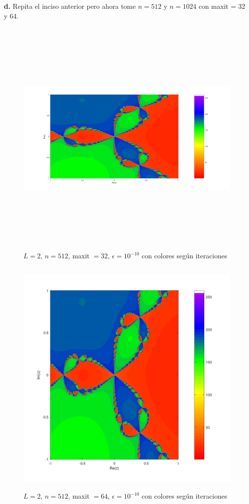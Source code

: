 \documentclass{article} %
\begin{document}
\textbf{d.} Repita el inciso anterior pero ahora tome $n=512$ y $n=1024$ con maxit = 32 y 64.

\begin{figure}[H]
    \centering
    \includegraphics[width=152mm, height=120mm]{images/L2n512maxit32e10-10colordegradado.png}
    \caption{$L=2$, $n=512$, maxit $=32$, $\epsilon=10^{-10}$ con colores según iteraciones}
\end{figure}

\begin{figure}[H]
    \centering
    \includegraphics[width=152mm, height=120mm]{images/L2n512maxit64e10-10colordegradado.png}
    \caption{$L=2$, $n=512$, maxit $=64$, $\epsilon=10^{-10}$ con colores según iteraciones}
\end{figure}
\end{document}
